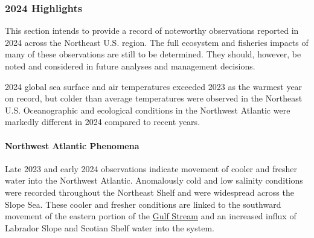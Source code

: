 \documentclass[
  10pt,
]{article}
\begin{document}
\hypertarget{highlights}{%
\subsubsection{2024 Highlights}\label{highlights}}

This section intends to provide a record of noteworthy observations reported in 2024 across the Northeast U.S. region. The full ecosystem and fisheries impacts of many of these observations are still to be determined. They should, however, be noted and considered in future analyses and management decisions.

2024 global sea surface and air temperatures exceeded 2023 as the warmest year on record, but colder than average temperatures were observed in the Northeast U.S. Oceanographic and ecological conditions in the Northwest Atlantic were markedly different in 2024 compared to recent years.

\hypertarget{northwest-atlantic-phenomena}{%
\paragraph{Northwest Atlantic Phenomena}\label{northwest-atlantic-phenomena}}

Late 2023 and early 2024 observations indicate movement of cooler and fresher water into the Northwest Atlantic. Anomalously cold and low salinity conditions were recorded throughout the Northeast Shelf and were widespread across the Slope Sea. These cooler and fresher conditions are linked to the southward movement of the eastern portion of the \href{https://noaa-edab.github.io/catalog/gsi.html}{Gulf Stream} and an increased influx of Labrador Slope and Scotian Shelf water into the system.
\end{document}
